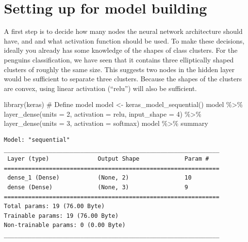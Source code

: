\documentclass[
  letterpaper,
]{krantz}
\newenvironment{Shaded}{\begin{snugshade}}{\end{snugshade}}
\newcommand{\AttributeTok}[1]{\textcolor[rgb]{0.40,0.45,0.13}{#1}}
\newcommand{\CommentTok}[1]{\textcolor[rgb]{0.37,0.37,0.37}{#1}}
\newcommand{\DecValTok}[1]{\textcolor[rgb]{0.68,0.00,0.00}{#1}}
\newcommand{\FunctionTok}[1]{\textcolor[rgb]{0.28,0.35,0.67}{#1}}
\newcommand{\NormalTok}[1]{\textcolor[rgb]{0.00,0.23,0.31}{#1}}
\newcommand{\OtherTok}[1]{\textcolor[rgb]{0.00,0.23,0.31}{#1}}
\newcommand{\SpecialCharTok}[1]{\textcolor[rgb]{0.37,0.37,0.37}{#1}}
\newcommand{\StringTok}[1]{\textcolor[rgb]{0.13,0.47,0.30}{#1}}
\begin{document}
\hypertarget{setting-up-for-model-building}{%
\section{Setting up for model
building}\label{setting-up-for-model-building}}

A first step is to decide how many nodes the neural network architecture
should have, and and what activation function should be used. To make
these decisions, ideally you already has some knowledge of the shapes of
class clusters. For the penguins classification, we have seen that it
contains three elliptically shaped clusters of roughly the same size.
This suggests two nodes in the hidden layer would be sufficient to
separate three clusters. Because the shapes of the clusters are convex,
using linear activation (``relu'') will also be sufficient.

\begin{Shaded}
\begin{Highlighting}[]
\FunctionTok{library}\NormalTok{(keras)}
\CommentTok{\# Define model}
\NormalTok{model }\OtherTok{\textless{}{-}} \FunctionTok{keras\_model\_sequential}\NormalTok{()}
\NormalTok{model }\SpecialCharTok{\%\textgreater{}\%} 
  \FunctionTok{layer\_dense}\NormalTok{(}\AttributeTok{units =} \DecValTok{2}\NormalTok{, }\AttributeTok{activation =} \StringTok{\textquotesingle{}relu\textquotesingle{}}\NormalTok{, }
              \AttributeTok{input\_shape =} \DecValTok{4}\NormalTok{) }\SpecialCharTok{\%\textgreater{}\%} 
  \FunctionTok{layer\_dense}\NormalTok{(}\AttributeTok{units =} \DecValTok{3}\NormalTok{, }\AttributeTok{activation =} \StringTok{\textquotesingle{}softmax\textquotesingle{}}\NormalTok{)}
\NormalTok{model }\SpecialCharTok{\%\textgreater{}\%}\NormalTok{ summary}
\end{Highlighting}
\end{Shaded}

\begin{verbatim}
Model: "sequential"
______________________________________________________________
 Layer (type)              Output Shape             Param #   
==============================================================
 dense_1 (Dense)           (None, 2)                10        
 dense (Dense)             (None, 3)                9         
==============================================================
Total params: 19 (76.00 Byte)
Trainable params: 19 (76.00 Byte)
Non-trainable params: 0 (0.00 Byte)
______________________________________________________________
\end{verbatim}
\end{document}

